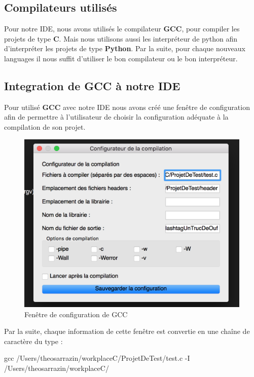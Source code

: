 \documentclass[a4paper,12pt]{article}
\begin{document}
	\subsection{Compilateurs utilisés}

		Pour notre IDE, nous avons utilisés le compilateur \textbf{GCC}, pour compiler les projets de type \textbf{C}. Mais nous utilisons aussi les interpréteur de python afin d'interpréter les projets de type \textbf{Python}. Par la suite, pour chaque nouveaux languages il nous suffit d'utiliser le bon compilateur ou le bon interpréteur.
		
	\subsection{Integration de \textbf{GCC} à notre IDE}

		Pour utilisé \textbf{GCC} avec notre IDE nous avons créé une fenêtre de configuration afin de permettre à l'utilisateur de choisir la configuration adéquate à la compilation de son projet.

			\begin{figure}[h!]
				\begin{center}
					\includegraphics[scale=0.7]{images/fenCompEx}
					\caption{Fenêtre de configuration de GCC}
				\end{center}
			\end{figure}

		Par la suite, chaque information de cette fenêtre est convertie en une chaîne de caractère du type : 

		gcc /Users/theosarrazin/workplaceC/ProjetDeTest/test.c  -I /Users/theosarrazin/workplaceC/
\end{document}
